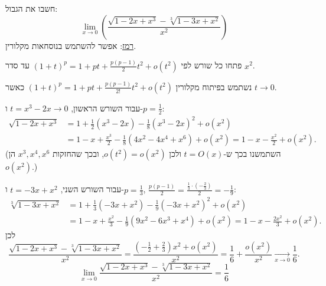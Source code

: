 
\begin{question}
חשבו את הגבול:
\[ \lim_{x\to0}\left(\frac{\sqrt{1-2x+x^3}-\sqrt[3]{1-3x+x^2}}{x^2}\right) \]
\underline{רמז}: אפשר להשתמש בנוסחאות מקלורין.
\end{question}

\begin{hint}
פתחו כל שורש לפי $(1+t)^p=1+pt+\frac{p(p-1)}{2}t^2+o(t^2)$ עד סדר $x^2$.
\end{hint}

\begin{solution}
נשתמש בפיתוח מקלורין $(1+t)^p=1+pt+\frac{p(p-1)}{2!}t^2+o(t^2)$ כאשר $t\to0$.

עבור השורש הראשון, $t=x^3-2x\to0$ ו-$p=\frac12$:
\begin{align*}
\sqrt{1-2x+x^3}&=1+\frac12(x^3-2x)-\frac18(x^3-2x)^2+o(x^2)\\
&=1-x+\frac{x^3}{2}-\frac18\left(4x^2-4x^4+x^6\right)+o(x^2)=1-x-\frac{x^2}{2}+o(x^2).
\end{align*}
(השתמשנו בכך ש-$t=O(x)$ ולכן $o(t^2)=o(x^2)$, ובכך שהחזקות $x^3,x^4,x^6$ הן $o(x^2)$.)

עבור השורש השני, $t=-3x+x^2$ ו-$p=\frac13$, $\frac{p(p-1)}{2}=\frac{\frac13\cdot(-\frac23)}{2}=-\frac19$:
\begin{align*}
\sqrt[3]{1-3x+x^2}&=1+\frac13(-3x+x^2)-\frac19(-3x+x^2)^2+o(x^2)\\
&=1-x+\frac{x^2}{3}-\frac19\left(9x^2-6x^3+x^4\right)+o(x^2)=1-x-\frac{2x^2}{3}+o(x^2).
\end{align*}
לכן
\[ \frac{\sqrt{1-2x+x^3}-\sqrt[3]{1-3x+x^2}}{x^2}=\frac{\left(-\frac12+\frac23\right)x^2+o(x^2)}{x^2}=\frac16+\frac{o(x^2)}{x^2}\xrightarrow[x\to0]{}\frac16. \]
\[ \boxed{\lim_{x\to0}\frac{\sqrt{1-2x+x^3}-\sqrt[3]{1-3x+x^2}}{x^2}=\frac16} \]
\end{solution}
